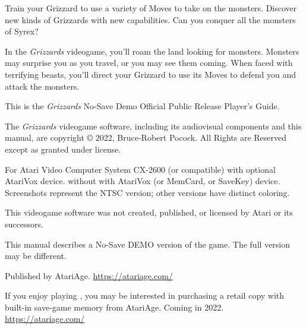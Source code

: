 \documentclass[9pt,twocolumn,openany,article]{memoir}
\newcommand\picaskip{\vspace{12pt}}
\begin{document}
\bigskip

Train your Grizzard to  use a variety of Moves to  take on the monsters.
Discover new kinds  of Grizzards with new capabilities.  Can you conquer
all the monsters of Syrex?

\bigskip

In the  \textit{Grizzards} videogame, you'll  roam the land  looking for
monsters. Monsters may  surprise you as you travel, or  you may see them
coming. When faced  with terrifying beasts, you'll  direct your Grizzard
to use its Moves to defend you and attack the monsters.

\picaskip\vfill

This    is    the     \textit{Grizzards}    \ifdefined\NOSAVE    No-Save
\fi\ifdefined\DEMO Demo \fi\ifdefined\ATARIAGESAVE Official \else Public
Release \fi Player's Guide.

\picaskip

{\small 
The  \textit{Grizzards} videogame  software,  including its  audiovisual
components   and  this   manual,   are   copyright  \copyright{}   2022,
Bruce-Robert  Pocock.   All  Rights  are  Reserved   except  as  granted
under license. }

\bigskip

{\small For Atari Video Computer System CX-2600 (or compatible)
\ifdefined\ATARIAGESAVE   with    optional   AtariVox    device.   \else
\ifdefined\NOSAVE  without  \else  with  \fi AtariVox  (or  MemCard,  or
SaveKey)  device.  \fi Screenshots  represent  the  NTSC version;  other
versions have distinct coloring. }

\bigskip

{\small This videogame software was not created, published, or licensed by Atari
or its successors. }

\picaskip

\ifdefined\DEMO
\bigskip

This manual  describes a \ifdefined\NOSAVE  No-Save \fi DEMO  version of
the game. The full version may be different.

\fi

Published by AtariAge. \href{https://atariage.com/}{https://atariage.com/}

\ifdefined\ATARIAGESAVE\else  If you  enjoy playing  ,
you  may  be  interested  in  purchasing a  retail  copy  with  built-in
save-game    memory    from    AtariAge.    Coming    in    2022.  
\href{https://atariage.com/}{https://atariage.com/}

\bigskip
\end{document}
